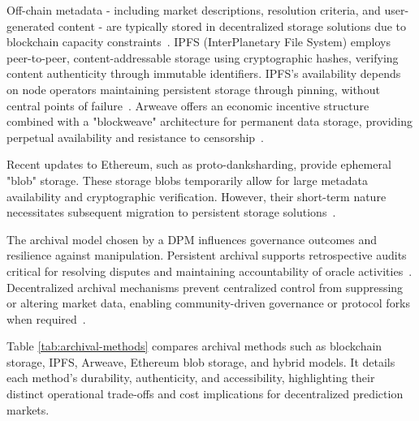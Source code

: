 {Off-chain metadata - including market descriptions, resolution criteria, and user-generated content - are typically stored in decentralized storage solutions due to blockchain capacity constraints~\cite{BCCJM21}. IPFS (InterPlanetary File System) employs peer-to-peer, content-addressable storage using cryptographic hashes, verifying content authenticity through immutable identifiers. IPFS’s availability depends on node operators maintaining persistent storage through pinning, without central points of failure~\cite{IM24}. Arweave offers an economic incentive structure combined with a "blockweave" architecture for permanent data storage, providing perpetual availability and resistance to censorship~\cite{BCKW23}.

Recent updates to Ethereum, such as proto-danksharding, provide ephemeral "blob" storage. These storage blobs temporarily allow for large metadata availability and cryptographic verification. However, their short-term nature necessitates subsequent migration to persistent storage solutions~\cite{Fo20}.

The archival model chosen by a DPM influences governance outcomes and resilience against manipulation. Persistent archival supports retrospective audits critical for resolving disputes and maintaining accountability of oracle activities~\cite{ClEsGS21}. Decentralized archival mechanisms prevent centralized control from suppressing or altering market data, enabling community-driven governance or protocol forks when required~\cite{BCKW23}.

Table \ref{tab:archival-methods} compares archival methods such as blockchain storage, IPFS, Arweave, Ethereum blob storage, and hybrid models. It details each method's durability, authenticity, and accessibility, highlighting their distinct operational trade-offs and cost implications for decentralized prediction markets.

}
